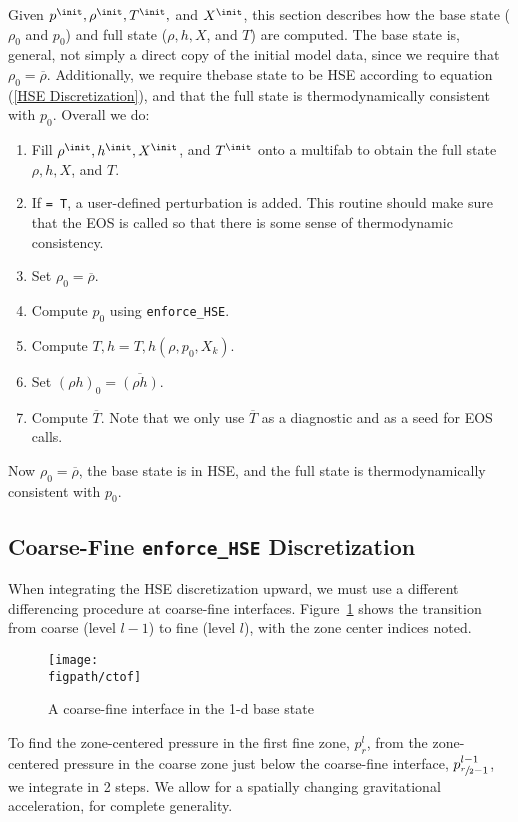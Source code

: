 Given $p^{\init}, \rho^{\init}, T^{\init},$ and $X^{\init}$, this
section describes how the base state ($\rho_0$ and $p_0$) and full
state ($\rho, h, X$, and $T$) are computed.  The base state is, general, not
simply a direct copy of the initial model data, since we require that
$\rho_0 = \overline\rho$.  Additionally, we require thebase state to
be HSE according to equation (\ref{HSE Discretization}), and that the full
state is thermodynamically consistent with $p_0$.  Overall we do:
\begin{enumerate}
\item Fill $\rho^{\init}, h^{\init}, X^{\init}$, and $T^{\init}$ onto a 
  multifab to obtain the full state $\rho, h, X$, and $T$.
\item If  {\tt = T}, a user-defined perturbation is
  added.  This routine should make sure that the EOS is called so that
  there is some sense of thermodynamic consistency.
\item Set $\rho_0 = \overline\rho$.
\item Compute $p_0$ using {\tt enforce\_HSE}.
\item Compute $T,h = T,h(\rho,p_0,X_k)$.
\item Set $(\rho h)_0 = \overline{(\rho h)}$.
\item Compute $\overline{T}$.  Note that we only use $\overline{T}$ as
  a diagnostic and as a seed for EOS calls.
\end{enumerate}
Now $\rho_0 = \overline\rho$, the base state is in HSE, and the full
state is thermodynamically consistent with $p_0$.

\subsection{Coarse-Fine {\tt enforce\_HSE} Discretization}\label{Sec:Coarse-Fine HSE Discretization}
When integrating the HSE discretization upward, we must use a different
differencing procedure at coarse-fine interfaces.  Figure~\ref{fig:ctof} shows
the transition from coarse (level $l-1$) to fine (level $l$), with the zone
center indices noted.  
\begin{figure}[t]
\centering
\texttt{[image: \\figpath/ctof]}
\caption{\label{fig:ctof} A coarse-fine interface in the 1-d base state}
\end{figure}

To find the zone-centered pressure in the first fine zone, $p_r^l$, from
the zone-centered pressure in the coarse zone just below the coarse-fine interface,
$p_{\sfrac{r}{2}-1}^{l-1}$, we integrate in 2 steps.  We allow for a spatially
changing gravitational acceleration, for complete generality.

